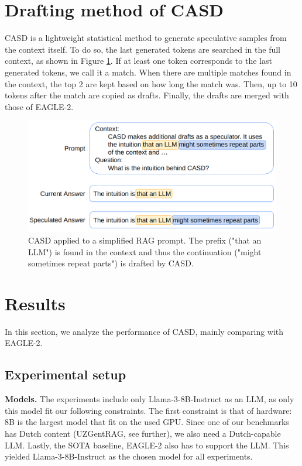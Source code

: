 \section{Drafting method of CASD}
CASD is a lightweight statistical method to generate speculative samples from the context itself. To do so, the last generated tokens are searched in the full context, as shown in Figure \ref{fig:CASD_example_prompt}. If at least one token corresponds to the last generated tokens, we call it a match. When there are multiple matches found in the context, the top 2 are kept based on how long the match was. Then, up to 10 tokens after the match are copied as drafts. Finally, the drafts are merged with those of EAGLE-2.

\begin{figure}[h]
	\centering
	\includegraphics[width=0.7\linewidth]{fig/CASD_example_prompt.png}
	\caption{CASD applied to a simplified RAG prompt. The \textcolor{orange-ish}{prefix} ("that an LLM") is found in the context and thus the \textcolor{blue-ish}{continuation} ("might sometimes repeat parts") is drafted by CASD.}
	\label{fig:CASD_example_prompt}
\end{figure}

\section{Results}
In this section, we analyze the performance of CASD, mainly comparing with EAGLE-2.

\subsection{Experimental setup}
\textbf{Models.} The experiments include only Llama-3-8B-Instruct \cite{grattafiori2024llama} as an LLM, as only this model fit our following constraints. The first constraint is that of hardware: 8B is the largest model that fit on the used GPU. Since one of our benchmarks has Dutch content (UZGentRAG, see further), we also need a Dutch-capable LLM. Lastly, the SOTA baseline, EAGLE-2 also has to support the LLM. This yielded Llama-3-8B-Instruct as the chosen model for all experiments. 

